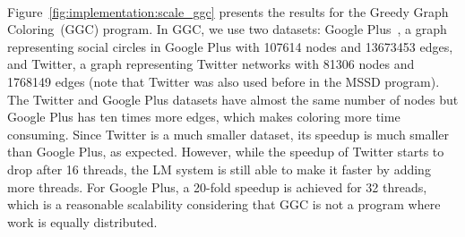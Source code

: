 \begin{figure}[]
\begin{subfigure}[b]{\plotsize\textwidth}
                \label{fig:implementation:scale_ht120}
        \end{subfigure}\\
        \label{fig:implementation:scale_ht}
\end{figure}

Figure~\ref{fig:implementation:scale_ggc} presents the results for the Greedy
Graph Coloring~(GGC) program. In GGC, we use two datasets: Google
Plus~\cite{snapnets}, a graph representing social circles in Google Plus with
107614 nodes and 13673453 edges, and Twitter, a graph representing Twitter
networks with 81306 nodes and 1768149 edges (note that Twitter was also used
before in the MSSD program). The Twitter and Google Plus datasets have almost
the same number of nodes but Google Plus has ten times more edges, which makes
coloring more time consuming. Since Twitter is a much smaller dataset, its
speedup is much smaller than Google Plus, as expected. However, while the
speedup of Twitter starts to drop after 16 threads, the LM system is still able
to make it faster by adding more threads. For Google Plus, a 20-fold speedup is
achieved for 32 threads, which is a reasonable scalability considering that GGC
is not a program where work is equally distributed.

